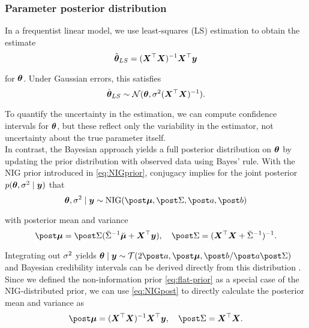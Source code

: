 \subsubsection*{Parameter posterior distribution}

In a frequentist linear model, we use least-squares (LS) estimation to obtain the estimate
\begin{equation}\label{eq:LSE}
    \hat{\bm{\theta}}_{LS} = (\bm{X}^\top \bm{X})^{-1} \bm{X}^\top \bm{y}
\end{equation}

for $\bm{\theta}$.
Under Gaussian errors, this satisfies
\begin{equation*}
    \hat{\bm{\theta}}_{LS} \sim \mathcal{N}(\bm{\theta}, \sigma^2 (\bm{X}^\top \bm{X})^{-1}).
\end{equation*}

To quantify the uncertainty in the estimation, we can compute confidence intervals for $\bm{\theta}$, but these reflect only the variability in the estimator, not uncertainty about the true parameter itself.\\

In contrast, the Bayesian approach yields a full posterior distribution on $\bm{\theta}$ by updating the prior distribution with observed data using Bayes' rule.
With the NIG prior introduced in \autoref{eq:NIGprior}, conjugacy implies for the joint posterior $p(\bm{\theta}, \sigma^2 \mid \bm{y})$ that
\begin{equation*}
    \btheta, \ssd \mid \by \sim \text{NIG}(\mupo, \Sdpo, \apo, \bpo)
\end{equation*}

with posterior mean and variance \footnotemark
\begin{equation} \label{eq:NIGpost}
        \mupo = \Sdpo (\Sdipri \mupri + \bX^\top \by), \quad \Sdpo = (\bX^\top \bX + \Sdipri)^{-1}.
\end{equation}


Integrating out $\sigma^2$ yields $\btheta \mid \by \sim \Tcal(2 \apo, \mupo, \bpo / \apo \Sdpo)$ and Bayesian credibility intervals can be derived directly from this distribution \citep[see e.g.][]{held_likelihood_2020}.\\

Since we defined the non-information prior \autoref{eq:flat-prior} as a special case of the NIG-distributed prior, we can use \autoref{eq:NIGpost} to directly calculate the posterior mean and variance as
\begin{equation*}
        \mupo = (\bX^\top \bX)^{-1} \bX^\top \by, \quad
        \Sdpo = \bX^\top \bX.
\end{equation*}

